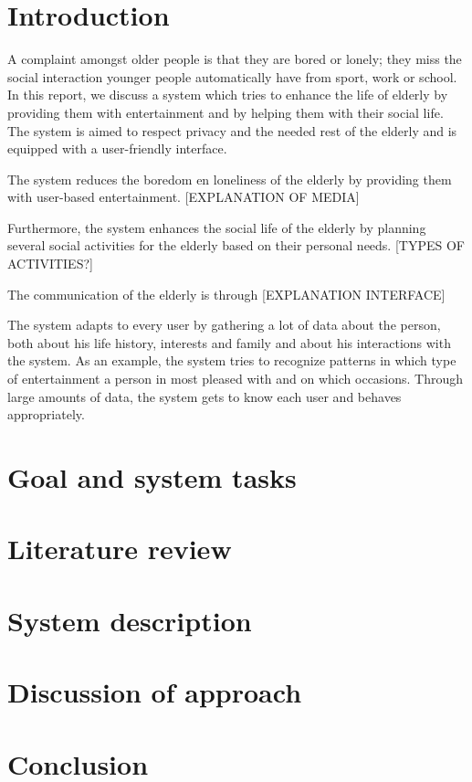 \documentclass[12pt, a4paper]{article}
\begin{document}
\tableofcontents 
\newpage
\section{Introduction}
A complaint amongst older people is that they are bored or lonely; they miss the social interaction younger people automatically have from sport, work or school. In this report, we discuss a system which tries to enhance the life of elderly by providing them with entertainment and by helping them with their social life. The system is aimed to respect privacy and the needed rest of the elderly and is equipped with a user-friendly interface.

The system reduces the boredom en loneliness of the elderly by providing them with user-based entertainment. [EXPLANATION OF MEDIA]

Furthermore, the system enhances the social life of the elderly by planning several social activities for the elderly based on their personal needs. [TYPES OF ACTIVITIES?]

The communication of the elderly is through [EXPLANATION INTERFACE]

The system adapts to every user by gathering a lot of data about the person, both about his life history, interests and family and about his interactions with the system. As an example, the system tries to recognize patterns in which type of entertainment a person in most pleased with and on which occasions. Through large amounts of data, the system gets to know each user and behaves appropriately.

\section{Goal and system tasks}

\section{Literature review}

\section{System description}

\section{Discussion of approach}

\section{Conclusion}
\begin{thebibliography}{x}

\end{thebibliography}
\end{document}

